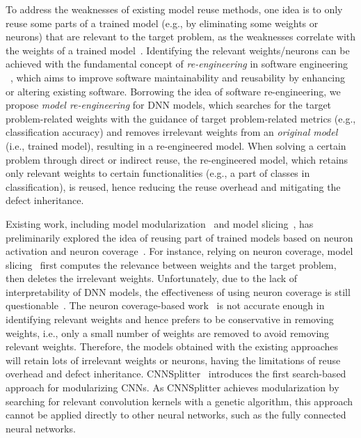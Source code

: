 To address the weaknesses of existing model reuse methods, one idea is to only reuse some parts of a trained model (e.g., by eliminating some weights or neurons) that are relevant to the target problem, as the weaknesses correlate with the weights of a trained model~\cite{rezaei2019target, ReMos}.
Identifying the relevant weights/neurons can be achieved with the fundamental concept of \textit{re-engineering} in software engineering
~\cite{rosenberg1996software,chikofsky1990reverse}, which aims to improve software maintainability and reusability by
enhancing or altering existing software.
Borrowing the idea of software re-engineering, we propose \emph{model re-engineering} for DNN models, which searches for the target problem-related weights with the guidance of target problem-related metrics (e.g., classification accuracy) and removes irrelevant weights from an \textit{original model} (i.e., trained model), resulting in a re-engineered model.
When solving a certain problem through direct or indirect reuse, the re-engineered model, which retains only relevant weights to certain functionalities (e.g., a part of classes in classification), is reused, hence reducing the reuse overhead and mitigating the defect inheritance. %

Existing work, including model modularization~\cite{nnmodularity2022icse,fse2020modularity,qi2022patching} and model slicing~\cite{ReMos}, has preliminarily explored the idea of reusing part of trained models based on neuron activation and %
neuron coverage~\cite{deepxplore, dlfuzz}.
For instance, relying on neuron coverage, model slicing~\cite{ReMos} first computes the relevance between weights and the target problem, then deletes the irrelevant weights.
Unfortunately, due to the lack of interpretability of DNN models, the effectiveness of using neuron coverage is still questionable~\cite{neuron_activation,li2019structural}.
The neuron coverage-based work~\cite{nnmodularity2022icse,fse2020modularity,ReMos} is not accurate enough in identifying relevant weights and hence prefers to be conservative in removing weights, i.e., only a small number of weights are removed to avoid removing relevant weights.
Therefore, the models %
obtained with the existing approaches~\cite{nnmodularity2022icse,fse2020modularity,ReMos} will retain lots of irrelevant weights or neurons, having the limitations of reuse overhead and defect inheritance.
CNNSplitter~\cite{qi2022patching} introduces the first search-based approach for modularizing CNNs. As CNNSplitter achieves modularization by searching for relevant convolution kernels with a genetic algorithm, this approach cannot be applied directly to other neural networks, such as the fully connected neural networks.




